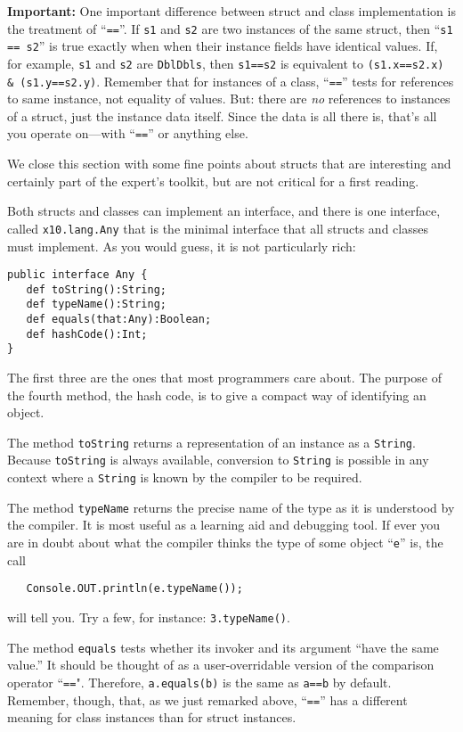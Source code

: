 {\bf Important: } One important difference between struct and class
implementation is the treatment of ``{\tt ==}''.   If {\tt s1} and {\tt s2} are
two instances of the same struct, then ``{\tt s1 == s2}'' is true exactly when
when their instance fields have identical values.  If, for example, 
{\tt s1} and {\tt s2} are {\tt DblDbls}, then {\tt s1==s2}
is equivalent to {\tt (s1.x==s2.x) \& (s1.y==s2.y)}.  Remember that for
instances of a class, ``{\tt ==}'' tests for references to same instance,
not equality of values. But: there are {\em no} references to instances of a
struct, just the instance data itself.  Since the data is all there is, that's
all you operate on---with ``{\tt ==}'' or anything else.

We close this section with some fine points about structs that are interesting
and certainly part of the expert's toolkit, but are not critical for a first
reading.

\label{ssec:wasacs}
Both structs and classes can implement an interface, and there is one interface,
called {\tt x10.lang.Any} that is the minimal interface that all structs and
classes must implement.  As you would guess, it is not particularly rich:
\begin{verbatim}
public interface Any {
   def toString():String;
   def typeName():String;
   def equals(that:Any):Boolean;
   def hashCode():Int;
}
\end{verbatim}
The first three are the ones that most programmers care about.  The purpose of
the fourth method, the hash code, is to give a compact way of identifying an
object.

The method {\tt toString} returns
a representation of an instance as a {\tt String}.  Because {\tt toString} is
always available, conversion to {\tt String} is possible in any context where a
{\tt String} is known by the compiler to be required. 

The method {\tt typeName} returns the precise name of the type as it is
understood by the \Xten{} compiler.  It is most useful as a learning aid and
debugging tool.  If ever you are in doubt about what the compiler thinks the
type of some object ``{\tt e}'' is, the call

{\tt  \ \ \ Console.OUT.println(e.typeName());}

will tell you.  Try a few, for instance: {\tt 3.typeName()}.

The method {\tt equals} tests whether its invoker and its argument ``have the
same value.''  It should be thought of as a user-overridable version of the
comparison operator ``{\tt ==}".  Therefore, {\tt a.equals(b)} is the same as
{\tt a==b} by default.  Remember, though, that, as we just remarked above,
``{\tt ==}'' has a different meaning for class instances than for
struct instances.
 
